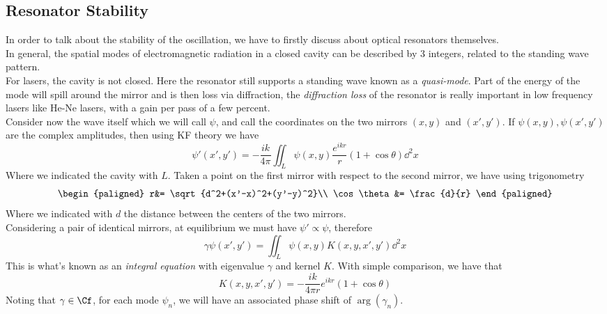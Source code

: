 \documentclass[../electromagnetism.tex]{subfiles}
\begin{document}
\subsection{Resonator Stability}
In order to talk about the stability of the oscillation, we have to firstly discuss about optical resonators themselves.\\
In general, the spatial modes of electromagnetic radiation in a closed cavity can be described by 3 integers, related to the standing wave pattern.\\
For lasers, the cavity is not closed. Here the resonator still supports a standing wave known as a \textit{quasi-mode}. Part of the energy of the mode will spill around the mirror and is then loss via diffraction, the \textit{diffraction loss} of the resonator is really important in low frequency lasers like He-Ne lasers, with a gain per pass of a few percent.\\
Consider now the wave itself which we will call $\psi$, and call the coordinates on the two mirrors $(x, y)$ and $(x', y')$. If $\psi(x, y), \psi(x', y')$ are the complex amplitudes, then using KF theory we have
\begin{equation}
	\psi'(x', y')=-\frac{ik}{4\pi}\iint_{L}^{}\psi(x, y)\frac{e^{ikr}}{r}(1+\cos\theta)\dd^{2}{x}
	\label{eq:kflaser.res}
\end{equation}
Where we indicated the cavity with $L$. Taken a point on the first mirror with respect to the second mirror, we have using trigonometry
\begin{equation*}
	\begin{paligned}
	r&= \sqrt{d^2+(x'-x)^2+(y'-y)^2}\\
	\cos\theta&= \frac{d}{r}
	\end{paligned}
\end{equation*}
Where we indicated with $d$ the distance between the centers of the two mirrors.\\
Considering a pair of identical mirrors, at equilibrium we must have $\psi'\propto\psi$, therefore
\begin{equation}
	\gamma\psi(x', y')=\iint_{L}^{}\psi(x, y)K(x, y, x', y')\dd^{2}{x}
	\label{eq:kernel.res}
\end{equation}
This is what's known as an \textit{integral equation} with eigenvalue $\gamma$ and kernel $K$. With simple comparison, we have that
\begin{equation*}
	K(x, y, x', y')=-\frac{ik}{4\pi r}e^{ikr}(1+\cos\theta)
\end{equation*}
Noting that $\gamma\in\Cf$, for each mode $\psi_n$, we will have an associated phase shift of $\arg\left( \gamma_n \right)$.\\
\end{document}
